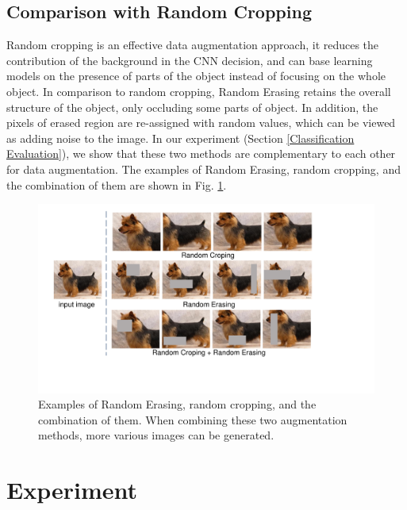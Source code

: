 \documentclass[10pt,twocolumn,letterpaper]{article}
\begin{document}
\subsection{Comparison with Random Cropping}
    Random cropping is an effective data augmentation approach, it reduces the contribution of the background in the CNN decision, and can base learning models on the presence of parts of the object instead of focusing on the whole object. In comparison to random cropping, Random Erasing retains the overall structure of the object, only occluding some parts of object. In addition, the pixels of erased region are re-assigned with random values, which can be viewed as adding noise to the image.
    In our experiment (Section \ref{Classification Evaluation}), we show that these two methods are complementary to each other for data augmentation.
    The examples of Random Erasing, random cropping, and the combination of them are shown in Fig. \ref{fig:example_randomcrop}.
\begin{figure}[!t]
\centering
\includegraphics[width=0.9\linewidth]{img/example_randomcrop}
\caption{Examples of Random Erasing, random cropping, and the combination of them. When combining these two augmentation methods, more various images can be generated.}
\label{fig:example_randomcrop}
\end{figure}

\section{Experiment}
\end{document}
